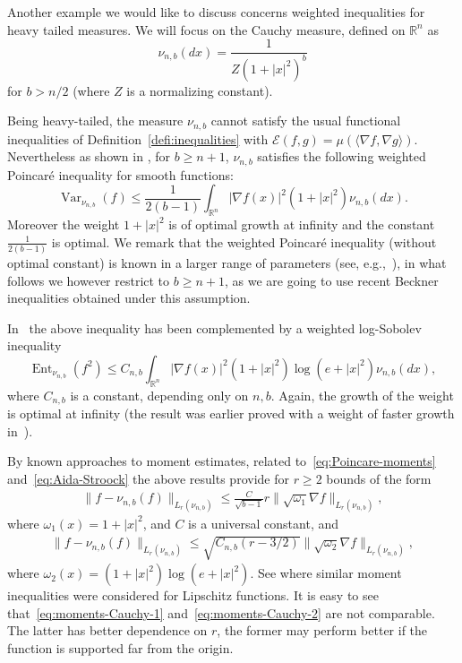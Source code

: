 \documentclass[a4paper]{amsart}
\theoremstyle{definition}
\theoremstyle{remark}
\numberwithin{equation}{section}
\newcommand*{\RR}{\mathbb{R}}
\newcommand*{\calE}{\mathcal{E}}
\DeclareMathOperator{\Ent}{Ent}	%
\DeclareMathOperator{\Var}{Var}	%
\begin{document}
Another example we would like to discuss concerns weighted inequalities for heavy tailed measures. We will focus on the Cauchy measure, defined on $\RR^n$ as
\begin{displaymath}
  \nu_{n,b}(dx) = \frac{1}{Z(1+|x|^2)^b}
\end{displaymath}
for $b > n/2$ (where $Z$ is a normalizing constant).

Being heavy-tailed, the measure $\nu_{n,b}$ cannot satisfy the usual functional inequalities of Definition~\eqref{defi:inequalities} with $\calE(f,g) = \mu(\langle \nabla f,\nabla g\rangle)$. Nevertheless as shown in \cite{SchefferPhD,MR2320246,MR2726546,MR3132733}, for $b \ge n+1$, $\nu_{n,b}$ satisfies the following weighted Poincar\'e inequality for smooth functions:
\begin{displaymath}
\Var_{\nu_{n,b}}(f) \le \frac{1}{2(b-1)}\int_{\RR^n} |\nabla f(x)|^2(1+|x|^2)\nu_{n,b}(dx).
\end{displaymath}
Moreover the weight $1+|x|^2$ is of optimal growth at infinity and the constant $\frac{1}{2(b-1)}$ is optimal.
We remark that the weighted Poincar\'e inequality (without optimal constant) is known in a larger range of parameters (see, e.g.,~\cite{MR2510011}), in what follows we however restrict to $b \ge n+1$, as we are going to use recent Beckner inequalities obtained under this assumption.

In~\cite{MR3008255} the above inequality has been complemented by a weighted log-Sobolev inequality
\begin{displaymath}
  \Ent_{\nu_{n,b}} (f^2) \le C_{n,b}\int_{\RR^n} |\nabla f(x)|^2(1+|x|^2)\log(e+|x|^2)\nu_{n,b}(dx),
\end{displaymath}
where $C_{n,b}$ is a constant, depending only on $n,b$. Again, the growth of the weight is optimal at infinity (the result was earlier proved with a weight of faster growth in~\cite{MR2510011}).

By known approaches to moment estimates, related to~\eqref{eq:Poincare-moments} and~\eqref{eq:Aida-Stroock} the above results provide for $r \ge 2$ bounds of the form
\begin{align}\label{eq:moments-Cauchy-1}
\|f - \nu_{n,b}(f)\|_{L_r(\nu_{n,b})} \le \frac{C}{\sqrt{b-1}}r\| \sqrt{\omega_1}\nabla f\|_{L_r(\nu_{n,b})},
\end{align}
where $\omega_1(x) = 1+|x|^2$, and $C$ is a universal constant, and
\begin{align}\label{eq:moments-Cauchy-2}
  \|f - \nu_{n,b}(f)\|_{L_r(\nu_{n,b})} \le \sqrt{C_{n,b}(r-3/2)}\|\sqrt{\omega_2}\nabla f\|_{L_r(\nu_{n,b})},
\end{align}
where $\omega_2(x) = (1+|x|^2)\log(e+|x|^2)$. See \cite{MR2510011,MR3008255} where similar moment inequalities were considered for Lipschitz functions. It is easy to see that~\eqref{eq:moments-Cauchy-1} and~\eqref{eq:moments-Cauchy-2} are not comparable. The latter has better dependence on $r$, the former may perform better if the function is supported far from the origin.
\end{document}
